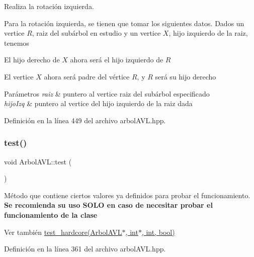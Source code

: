 Realiza la rotación izquierda. 

Para la rotación izquierda, se tienen que tomar los siguientes datos. Dados un vertice $R$, raiz del subárbol en estudio y un vertice $X$, hijo izquierdo de la raiz, tenemos
\begin{DoxyItemize}
\item El hijo derecho de $X$ ahora será el hijo izquierdo de $R$
\item El vertice $X$ ahora será padre del vértice $R$, y $R$ será su hijo derecho ~\newline
  
\begin{DoxyParams}{Parámetros}
{\em raiz} & puntero al vertice raiz del subárbol especificado \\
\hline
{\em hijo\+Izq} & puntero al vertice del hijo izquierdo de la raiz dada \\
\hline
\end{DoxyParams}

\end{DoxyItemize}

Definición en la línea 449 del archivo arbol\+A\+V\+L.\+hpp.

\mbox{\label{classArbolAVL_a783a3ffe994d8c2b4069d2fd45afab7f}} 
\subsubsection{\texorpdfstring{test()}{test()}}
{\footnotesize\ttfamily void Arbol\+A\+V\+L\+::test (\begin{DoxyParamCaption}{ }\end{DoxyParamCaption})}



Método que contiene ciertos valores ya definidos para probar el funcionamiento. {\bfseries Se recomienda su uso S\+O\+LO en caso de necesitar probar el funcionamiento de la clase} 

\begin{DoxySeeAlso}{Ver también}
\hyperlink{classArbolAVL_aeb90eb1614513b7438f98a43766d573d}{test\+\_\+hardcore(\+Arbol\+A\+V\+L$\ast$, int$\ast$, int, bool)} 
\end{DoxySeeAlso}


Definición en la línea 361 del archivo arbol\+A\+V\+L.\+hpp.

\mbox{\label{classArbolAVL_aeb90eb1614513b7438f98a43766d573d}} 
